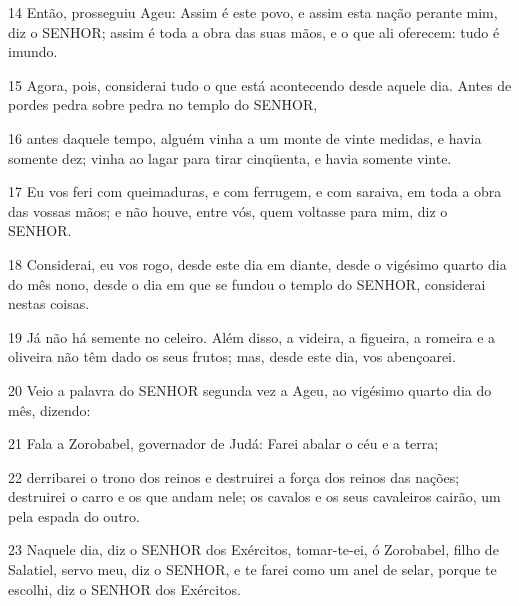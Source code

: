 \par 14 Então, prosseguiu Ageu: Assim é este povo, e assim esta nação perante mim, diz o SENHOR; assim é toda a obra das suas mãos, e o que ali oferecem: tudo é imundo.
\par 15 Agora, pois, considerai tudo o que está acontecendo desde aquele dia. Antes de pordes pedra sobre pedra no templo do SENHOR,
\par 16 antes daquele tempo, alguém vinha a um monte de vinte medidas, e havia somente dez; vinha ao lagar para tirar cinqüenta, e havia somente vinte.
\par 17 Eu vos feri com queimaduras, e com ferrugem, e com saraiva, em toda a obra das vossas mãos; e não houve, entre vós, quem voltasse para mim, diz o SENHOR.
\par 18 Considerai, eu vos rogo, desde este dia em diante, desde o vigésimo quarto dia do mês nono, desde o dia em que se fundou o templo do SENHOR, considerai nestas coisas.
\par 19 Já não há semente no celeiro. Além disso, a videira, a figueira, a romeira e a oliveira não têm dado os seus frutos; mas, desde este dia, vos abençoarei.
\par 20 Veio a palavra do SENHOR segunda vez a Ageu, ao vigésimo quarto dia do mês, dizendo:
\par 21 Fala a Zorobabel, governador de Judá: Farei abalar o céu e a terra;
\par 22 derribarei o trono dos reinos e destruirei a força dos reinos das nações; destruirei o carro e os que andam nele; os cavalos e os seus cavaleiros cairão, um pela espada do outro.
\par 23 Naquele dia, diz o SENHOR dos Exércitos, tomar-te-ei, ó Zorobabel, filho de Salatiel, servo meu, diz o SENHOR, e te farei como um anel de selar, porque te escolhi, diz o SENHOR dos Exércitos.


